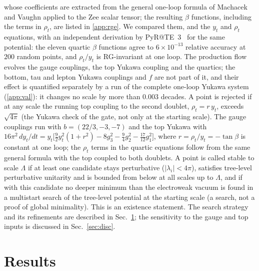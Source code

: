 \documentclass[twocolumn,epjc3]{svjour3}
\begin{document}
whose coefficients are extracted from the general one-loop formula of Machacek and Vaughn applied to the Zee scalar tensor; the resulting $\beta$ functions, including the terms in $\rho_t$, are listed in \ref{app:rge}. We compared them, and the $y_t$ and $\rho_t$ equations, with an independent derivation by PyR@TE~3~\cite{Sartore:2020gou} for the same potential: the eleven quartic $\beta$ functions agree to $6\times10^{-13}$ relative accuracy at $200$ random points, and $\rho_t/y_t$ is RG-invariant at one loop. The production flow evolves the gauge couplings, the top Yukawa coupling and the quartics; the bottom, tau and lepton Yukawa couplings and $f$ are not part of it, and their effect is quantified separately by a run of the complete one-loop Yukawa system (\ref{app:val}): it changes no scale by more than $0.003$ decades. A point is rejected if at any scale the running top coupling to the second doublet, $\rho_t=r\,y_t$, exceeds $\sqrt{4\pi}$ (the Yukawa check of the gate, not only at the starting scale). The gauge couplings run with $b=(22/3,-3,-7)$ and the top Yukawa with $16\pi^2\,dy_t/dt=y_t\big[\tfrac92y_t^2(1+r^2)-8g_3^2-\tfrac94g_2^2-\tfrac{17}{12}g_1^2\big]$, where $r=\rho_t/y_t=-\tan\beta$ is constant at one loop; the $\rho_t$ terms in the quartic equations follow from the same general formula with the top coupled to both doublets. A point is called stable to scale $\Lambda$ if at least one candidate stays perturbative ($|\lambda_i|<4\pi$), satisfies tree-level perturbative unitarity and is bounded from below at all scales up to $\Lambda$, and if with this candidate no deeper minimum than the electroweak vacuum is found in a multistart search of the tree-level potential at the starting scale (a search, not a proof of global minimality). This is an existence statement. The search strategy and its refinements are described in Sec.~\ref{sec:res}; the sensitivity to the gauge and top inputs is discussed in Sec.~\ref{sec:disc}.

\section{Results}\label{sec:res}
\end{document}
